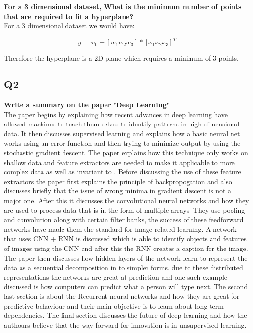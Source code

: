 \documentclass[a4paper, 12pt]{article}
\begin{document}
    \textbf{For a 3 dimensional dataset, What is the minimum number of points that are required to fit a hyperplane?}\\
    
    For a 3 dimensional dataset we would have: 

    $$y = w_0 + [w_1 w_2 w_3] * [x_1 x_2 x_3]^T$$

    Therefore the hyperplane is a 2D plane which requires a minimum of 3 points. 

    \subsection{Q2}

    \textbf{Write a summary on the paper 'Deep Learning'}\\

    The paper begins by explaining how recent advances in deep learning have allowed machines to teach them selves to identify patterns in high dimensional data. It then discusses supervised learning and explains how a basic neural net works using an error function and then trying to minimize output by using the stochastic gradient descent. The paper explains how this technique only works on shallow data and feature extractors are needed to make it applicable to more complex data as well as invariant to . Before discussing the use of these feature extractors the paper first explains the principle of backpropogation and also discusses briefly that the issue of wrong minima in gradient descent is not a major one. After this it discusses the convolutional neural networks and how they are used to process data that is in the form of multiple arrays. They use pooling and convolution along with certain filter banks, the success of these feedforward networks have made them the standard for image related learning. A network that uses CNN + RNN is discussed which is able to identify objects and features of images using the CNN and after this the RNN creates a caption for the image. The paper then discusses how hidden layers of the network learn to represent the data as a sequential decomposition in to simpler forms, due to these distributed representations the networks are great at prediction and one such example discussed is how computers can predict what a person will type next. The second last section is about the Recurrent neural networks and how they are great for predictive behaviour and their main objective is to learn about long-term dependencies. The final section discusses the future of deep learning and how the authours believe that the way forward for innovation is in unsupervised learning.
\end{document}

